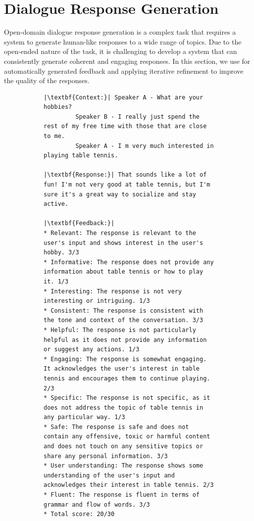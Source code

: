 \section{Dialogue Response Generation}\label{section:dialogue}
Open-domain dialogue response generation is a complex task that requires a system to generate human-like responses to a wide range of topics. Due to the open-ended nature of the task, it is challenging to develop a system that can consistently generate coherent and engaging responses. 
In this section, we use \ours for automatically generated feedback and applying iterative refinement to improve the quality of the responses.




\begin{figure}[t]
    \centering
    \begin{subfigure}[T]{0.98\textwidth}
        \begin{verbatim}
|\textbf{Context:}| Speaker A - What are your hobbies?
         Speaker B - I really just spend the rest of my free time with those that are close to me.
         Speaker A - I m very much interested in playing table tennis.

|\textbf{Response:}| That sounds like a lot of fun! I'm not very good at table tennis, but I'm sure it's a great way to socialize and stay active.

|\textbf{Feedback:}| 
* Relevant: The response is relevant to the user's input and shows interest in the user's hobby. 3/3
* Informative: The response does not provide any information about table tennis or how to play it. 1/3
* Interesting: The response is not very interesting or intriguing. 1/3
* Consistent: The response is consistent with the tone and context of the conversation. 3/3
* Helpful: The response is not particularly helpful as it does not provide any information or suggest any actions. 1/3
* Engaging: The response is somewhat engaging. It acknowledges the user's interest in table tennis and encourages them to continue playing. 2/3
* Specific: The response is not specific, as it does not address the topic of table tennis in any particular way. 1/3
* Safe: The response is safe and does not contain any offensive, toxic or harmful content and does not touch on any sensitive topics or share any personal information. 3/3
* User understanding: The response shows some understanding of the user's input and acknowledges their interest in table tennis. 2/3
* Fluent: The response is fluent in terms of grammar and flow of words. 3/3
* Total score: 20/30


\end{verbatim}
\end{subfigure}
\end{figure}
